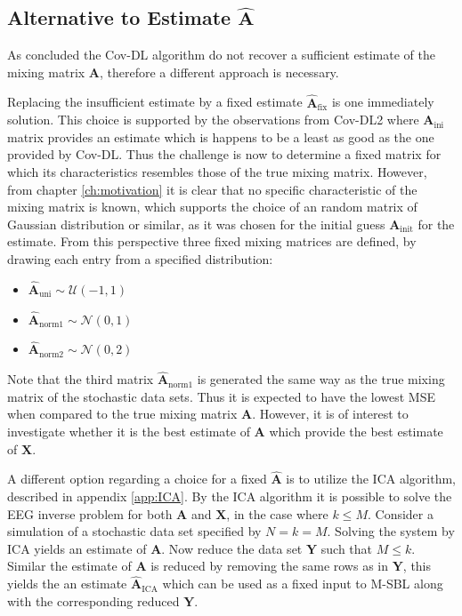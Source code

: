 \subsection{Alternative to Estimate $\hat{\textbf{A}}$}  
As concluded the Cov-DL algorithm do not recover a sufficient estimate of the mixing matrix $\mathbf{A}$, therefore a different approach is necessary. 

Replacing the insufficient estimate by a fixed estimate $\hat{\mathbf{A}}_{\text{fix}}$ is one immediately solution. 
This choice is supported by the observations from Cov-DL2 where $\mathbf{A}_{\text{ini}}$ matrix provides an estimate which is happens to be a least as good as the one provided by Cov-DL. 
Thus the challenge is now to determine a fixed matrix for which its characteristics resembles those of the true mixing matrix. 
However, from chapter \ref{ch:motivation} it is clear that no specific characteristic of the mixing matrix is known, which supports the choice of an random matrix of Gaussian distribution or similar, as it was chosen for the initial guess $\mathbf{A}_{\text{init}}$ for the estimate.   
From this perspective three fixed mixing matrices are defined, by drawing each entry from a specified distribution: 
\begin{itemize}
\item[] $\hat{\mathbf{A}}_{\text{uni}} \sim \mathcal{U}(-1,1)$
\item[] $\hat{\mathbf{A}}_{\text{norm1}} \sim \mathcal{N}(0,1)$                                           
\item[] $\hat{\mathbf{A}}_{\text{norm2}} \sim \mathcal{N}(0,2)$ 
\end{itemize}
Note that the third matrix $\hat{\mathbf{A}}_{\text{norm1}}$ is generated the same way as the true mixing matrix of the stochastic data sets. 
Thus it is expected to have the lowest MSE when compared to the true mixing matrix $\mathbf{A}$. 
However, it is of interest to investigate whether it is the best estimate of $\mathbf{A}$ which provide the best estimate of $\mathbf{X}$.   

A different option regarding a choice for a fixed $\hat{\mathbf{A}}$ is to utilize the ICA algorithm, described in appendix \ref{app:ICA}. 
By the ICA algorithm it is possible to solve the EEG inverse problem for both $\mathbf{A}$ and $\mathbf{X}$, in the case where $k \leq M$.
Consider a simulation of a stochastic data set specified by $N = k = M$. 
Solving the system by ICA yields an estimate of $\mathbf{A}$. 
Now reduce the data set $\mathbf{Y}$ such that $M \leq k$. 
Similar the estimate of $\mathbf{A}$ is reduced by removing the same rows as in $\mathbf{Y}$, this yields the an estimate $\hat{\mathbf{A}}_{\text{ICA}}$ which can be used as a fixed input to M-SBL along with the corresponding reduced $\mathbf{Y}$.

